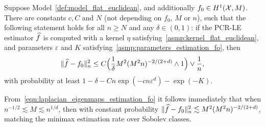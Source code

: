 \begin{theorem}
	\label{thm:laplacian_eigenmaps_estimation_fo}
	Suppose Model~\ref{def:model_flat_euclidean}, and additionally $f_0 \in H^1(\mathcal{X},M)$. There are constants $c,C$ and $N$ (not depending on $f_0$, $M$ or $n$), such that the following statement holds for all $n \geq N$ and any $\delta \in (0,1)$: if the PCR-LE estimator $\widehat{f}$ is computed with a kernel $\eta$ satisfying~\ref{asmp:kernel_flat_euclidean}, and parameters $\varepsilon$ and $K$ satisfying~\ref{asmp:parameters_estimation_fo}, then
	\begin{equation}
	\label{eqn:laplacian_eigenmaps_estimation_fo}
	\|\widehat{f} - f_0\|_n^2 \leq C\Bigl(\frac{1}{\delta}M^2(M^2n)^{-2/(2 + d)} \wedge 1\Bigr) \vee \frac{1}{n},
	\end{equation}
	with probability at least $1 - \delta - Cn\exp(-cn\varepsilon^d) - \exp(-K)$.
\end{theorem}
From~\eqref{eqn:laplacian_eigenmaps_estimation_fo} it follows immediately that when $n^{-1/2} \lesssim M \lesssim n^{1/d}$, then with constant probability $\|\widehat{f} - f_0\|_n^2 \lesssim M^2(M^2n)^{-2/(2 + d)}$, matching the minimax estimation rate over Sobolev classes.

